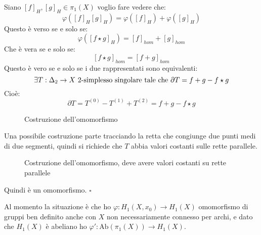 \documentclass[10pt, twoside=false, x11names]{scrbook}
\newenvironment{proof}{{\textbf{Dimostrazione}:}}{\hfill $\square$}
\renewcommand{\phi}{\varphi}
\newcommand{\Ab}[1]{\mathrm{Ab}\left( #1 \right)}
\begin{document}
\begin{proof}
  Siano $ [f]_H, [g]_H \in \pi_1(X) $ voglio fare vedere che:
  \[
    \phi ( [f]_H [g]_H) = \phi([f]_H) + \phi([g]_H)
  \]
  Questo è verso se e solo se:
  \[
    \phi([f \star g]_H) = [f]_{hom} + [g]_{hom}
  \]
  Che è vera se e solo se:
  \[
    [f \star g]_{hom} = [f + g]_{hom}
  \]
  Questo è vero se e solo se i due rappresentati sono equivalenti:
  \[
    \exists T: \Delta_2 \to X \text{ $ 2 $-simplesso singolare tale che } \partial T = f + g - f \star g
  \]
  Cioè:
  \[
    \partial T = T^{(0)} - T^{(1)} + T^{(2)} = f + g - f \star g
  \]
  \begin{figure}[htbp]
    \centering
    \caption{Costruzione dell'omomorfismo}
    \label{fig:lez3:proof_homo_1}
  \end{figure}
  Una possibile costruzione parte tracciando la retta che congiunge
  due punti medi di due segmenti, quindi si richiede che $ T $ abbia
  valori costanti sulle rette parallele.
  \begin{figure}[htbp]
    \centering
    \caption{Costruzione dell'omomorfismo, deve avere valori costanti su rette parallele}
    \label{fig:lez3:proof_homo}
  \end{figure}

Quindi è un omomorfismo.
\end{proof}

Al momento la situazione è che ho $ \phi: H_1(X,x_0) \to H_1(X) $ omomorfismo di
gruppi ben definito anche con $ X $ non necessariamente connesso per archi,
e dato che $ H_1(X) $ è abeliano ho $ \phi': \Ab{\pi_1(X)} \to H_1(X) $.
\end{document}
